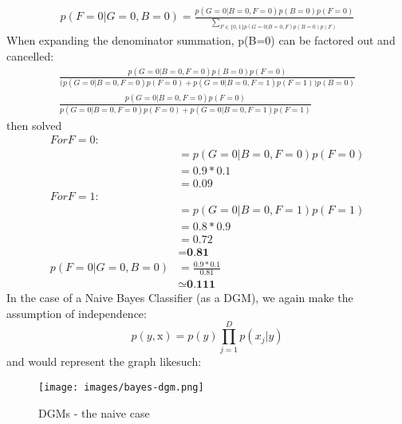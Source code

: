 \begin{align*}
    p(F=0|G=0,B=0) = \frac{p(G=0|B=0,F=0)p(B=0)p(F=0)}{\sum_{F\in \{0,1\}p(G=0|B=0,F)p(B=0)p(F)}}
\end{align*}
When expanding the denominator summation, p(B=0) can be factored out and cancelled:
\begin{align*}
    \frac{p(G=0|B=0,F=0)p(B=0)p(F=0)}
    {\big(p(G=0|B=0,F=0)p(F=0) + p(G=0|B=0,F=1)p(F=1)\big)p(B=0)} \\
    \frac{p(G=0|B=0,F=0)p(F=0)}
    {p(G=0|B=0,F=0)p(F=0) + p(G=0|B=0,F=1)p(F=1)}    
\end{align*}
then solved
\begin{align*}
    For F=0: \\
    & = p(G=0|B=0,F=0)p(F=0) \\    
    & = 0.9 * 0.1 \\
    & = 0.09 \\
    For F=1: \\
    & = p(G=0|B=0,F=1)p(F=1) \\    
    & = 0.8 * 0.9 \\
    & = 0.72 \\  
    & = \textbf{0.81} \\      
    p(F=0|G=0,B=0) & = \frac{0.9*0.1}{0.81} \\
    & \simeq \textbf{0.111} 
\end{align*}
In the case of a Naive Bayes Classifier (as a DGM), we again make the assumption of independence:
$$
p(y,\mathrm{x}) = p(y)\prod_{j=1}^Dp(x_j|y)
$$
and would represent the graph likesuch:
\begin{figure}[tb]
 \centering 
\texttt{[image: images/bayes-dgm.png]} 
 \caption{DGMs - the naive case}
 \label{fig:GDM}
\end{figure}